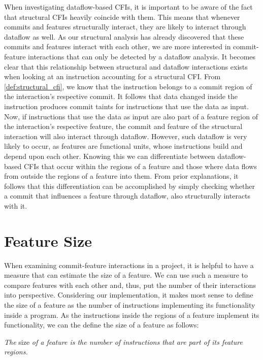 When investigating dataflow-based CFIs, it is important to be aware of the fact that structural CFIs heavily coincide with them.
This means that whenever commits and features structurally interact, they are likely to interact through dataflow as well.
As our structural analysis has already discovered that these commits and features interact with each other, 
we are more interested in commit-feature interactions that can only be detected by a dataflow analysis.
It becomes clear that this relationship between structural and dataflow interactions exists when looking at an instruction accounting for a structural CFI.
From \autoref{def:structural_cfi}, we know that the instruction belongs to a commit region of the interaction's respective commit.
It follows that data changed inside the instruction produces commit taints for instructions that use the data as input. 
Now, if instructions that use the data as input are also part of a feature region of the interaction's respective feature, the commit and feature of the structural interaction will also interact through dataflow.
However, such dataflow is very likely to occur, as features are functional units, whose instructions build and depend upon each other. 
Knowing this we can differentiate between dataflow-based CFIs that occur within the regions of a feature and those where data flows from outside the regions of a feature into them.
From prior explanations, it follows that this differentiation can be accomplished by simply checking whether a commit that influences a feature through dataflow, also structurally interacts with it. 

\section{Feature Size}\label{sec:feature_size}

When examining commit-feature interactions in a project, it is helpful to have a measure that can estimate the size of a feature.
We can use such a measure to compare features with each other and, thus, put the number of their interactions into perspective.
Considering our implementation, it makes most sense to define the size of a feature as the number of instructions implementing its functionality inside a program.
As the instructions inside the regions of a feature implement its functionality, we can the define the size of a feature as follows:
\begin{definition}\label{def:feature_size}
\emph{The} size \emph{of a feature is the number of instructions that are part of its feature regions.}
\end{definition}


